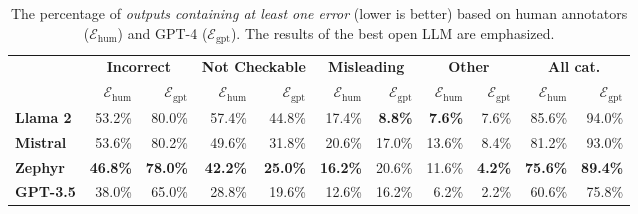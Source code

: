 \documentclass[12pt,notitlepage,a4paper,oneside,openany]{report}
\makeatletter
\newcommand*{\gptmetric}{$\mathcal{E}_{\text{gpt}}$}
\newcommand*{\humanmetric}{$\mathcal{E}_{\text{hum}}$}
\def\adl@drawiv#1#2#3{%
  \hskip.5\tabcolsep
  \xleaders#3{#2.5\@tempdimb #1{1}#2.5\@tempdimb}%
  #2\z@ plus1fil minus1fil\relax
  \hskip.5\tabcolsep}
\newcommand{\cdashlinelr}[1]{%
  \noalign{\vskip\aboverulesep
    \global\let\@dashdrawstore\adl@draw
    \global\let\adl@draw\adl@drawiv}
  \cdashline{#1}
  \noalign{\global\let\adl@draw\@dashdrawstore
    \vskip\belowrulesep}}
\makeatother
\begin{document}
\begin{table}[t]
    \footnotesize
    \centering
    \begin{tabular}{lrrrrrrrrrr}
        \toprule
                         & \multicolumn{2}{c}{\textbf{Incorrect}} & \multicolumn{2}{c}{\textbf{Not Checkable}} & \multicolumn{2}{c}{\textbf{Misleading}} & \multicolumn{2}{c}{\textbf{Other}} & \multicolumn{2}{c}{\textbf{All cat.}}                                                                                        \\
                         & \humanmetric{}                         & \gptmetric{}                               & \humanmetric{}                          & \gptmetric{}                       & \humanmetric{}                        & \gptmetric{}   & \humanmetric{} & \gptmetric{}   & \humanmetric{}  & \gptmetric{}    \\\midrule
        \textbf{Llama 2} & 53.2\%                                 & 80.0\%                                     & 57.4\%                                  & 44.8\%                             & 17.4\%                                & \textbf{8.8\%} & \textbf{7.6\%} & 7.6\%          & 85.6\%          & 94.0\%          \\
        \textbf{Mistral} & 53.6\%                                 & 80.2\%                                     & 49.6\%                                  & 31.8\%                             & 20.6\%                                & 17.0\%         & 13.6\%         & 8.4\%          & 81.2\%          & 93.0\%          \\
        \textbf{Zephyr}  & \textbf{46.8\%}                        & \textbf{78.0\%}                            & \textbf{42.2\%}                         & \textbf{25.0\%}                    & \textbf{16.2\%}                       & 20.6\%         & 11.6\%         & \textbf{4.2\%} & \textbf{75.6\%} & \textbf{89.4\%} \\\cdashlinelr{1-11}
        \textbf{GPT-3.5} & 38.0\%                                 & 65.0\%                                     & 28.8\%                                  & 19.6\%                             & 12.6\%                                & 16.2\%         & 6.2\%          & 2.2\%          & 60.6\%          & 75.8\%          \\\bottomrule
    \end{tabular}
    \caption[The percentage of outputs containing at least one error.]{The percentage of \textit{outputs containing at least one error} (lower is better) based on human annotators (\humanmetric{}) and  GPT-4 (\gptmetric{}). The results of the best open LLM  are emphasized.}
    \label{tab:quintd:results_errperex}
\end{table}
\end{document}
